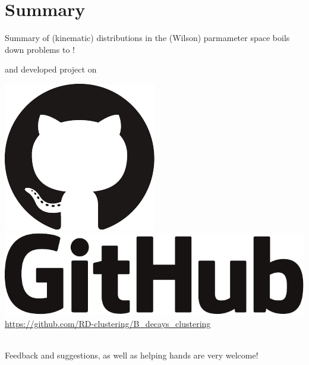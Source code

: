 \section{Summary}
\begin{frame}{Summary}
%	
%	
%	
	 of (kinematic) distributions in the (Wilson) parmameter space boils down  problems to !
	
	\bigskip
	 and  developed project on\\[2ex]
	\begin{minipage}{\linewidth}
		\includegraphics[height=2.5ex]{figures/software_logos/octocat.pdf}\hspace{0.3em}
		\includegraphics[height=2.5ex]{figures/software_logos/github.pdf}\\
		{\color{purple}\url{https://github.com/RD-clustering/B_decays_clustering}}
	\end{minipage}\\[2ex]
	Feedback and suggestions, as well as helping hands are very welcome!
\end{frame}